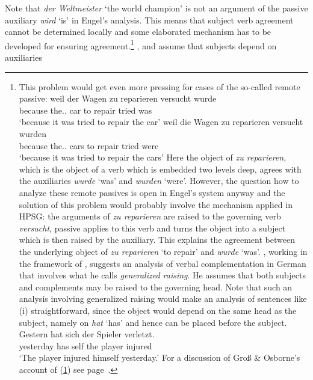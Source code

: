 Note that \emph{der Weltmeister} `the world champion' is not an argument of the passive auxiliary
\emph{wird} `is' in Engel's analysis. This means that subject verb agreement cannot be determined
locally and some elaborated mechanism has to be developed for ensuring agreement.\footnote{%
This problem would get even more pressing for cases of the so-called remote passive:
\eal
\ex
\gll weil der Wagen zu reparieren versucht wurde\\
     because the.\sg.\nom{} car to repair tried was\\
\glt `because it was tried to repair the car'
\ex
\gll weil die Wagen zu reparieren versucht wurden\\
     because the.\pl.\nom{} cars to repair tried were\\
\glt `because it was tried to repair the cars'
\zl
Here the object of \emph{zu reparieren}, which is the object of a verb which is embedded two levels deep,
agrees with the auxiliaries \emph{wurde} `was' and \emph{wurden} `were'. However, the question how to analyze these remote
passives is open in Engel's system anyway and the solution of this problem would probably involve the mechanism
applied in HPSG: the arguments of \emph{zu reparieren} are raised to the governing verb
\emph{versucht}, passive applies to this verb and turns the object into a subject which is then
raised by the auxiliary. This explains the agreement between the underlying object of \emph{zu
  reparieren} `to repair' and \emph{wurde} `was'. \citet{Hudson97a}, working in the framework of \wg, suggests an analysis of verbal
complementation in German that involves what he calls \emph{generalized raising}. He assumes
that both subjects and complements may be raised to the governing head. Note that such an analysis
involving generalized raising would make an analysis of sentences like (i) straightforward, since
the object would depend on the same head as the subject, namely on \emph{hat} `has' and hence can be
placed before the subject.
\ea
\label{ex-gestern-hat-sich-der-spieler-verletzt}
\gll Gestern hat sich der Spieler verletzt.\\
     yesterday has self the player injured\\
\glt `The player injured himself yesterday.'
\z
For a discussion of Groß \& Osborne's account of (\ref{ex-gestern-hat-sich-der-spieler-verletzt}) see page~\pageref{fig-gestern-hat-sich-der-spieler-verletzt-dg-rising}.
} 
\citet{Hudson90a-u}, \citet[Section~5.3]{Eroms2000a} and \citet{GO2009a} assume that subjects depend on auxiliaries

